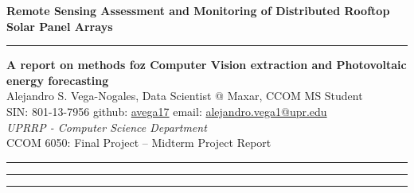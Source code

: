 \documentclass[a4paper,12pt]{article}
\begin{document}
\pagestyle{fancy}
\thispagestyle{empty}
\renewcommand*{\thefootnote}{\fnsymbol{footnote}}
\begin{center}
\Large{\textbf{Remote Sensing Assessment and Monitoring of Distributed Rooftop Solar Panel Arrays}}
\vspace{0.5cm}
{\color{gray}\hrule}
\medskip
\large\textbf{A report on methods foz Computer Vision extraction and Photovoltaic energy forecasting} \\
\bigskip
\normalsize Alejandro S. Vega-Nogales, Data Scientist @ Maxar, CCOM MS Student \\
\vspace{0.1cm}
SIN: 801-13-7956 \quad github: \href{https://github.com/avega17}{avega17}  \quad email: \href{mailto:alejandro.vega1@upr.edu}{alejandro.vega1@upr.edu} \\
\vspace{0.1cm}
\textit{UPRRP - Computer Science Department} \\
\vspace{0.1cm}
CCOM 6050: Final Project -- Midterm Project Report
\medskip
\normalsize
\end{center}
{\color{gray}\hrule} 
\vspace{0.4cm} 

\tableofcontents
\hfill
\clearpage

\newcommand{\reportpath}{./report/src}


{\color{gray}\hrule}
\clearpage
% 
{\color{gray}\hrule}
\medskip




\clearpage


\end{document}
